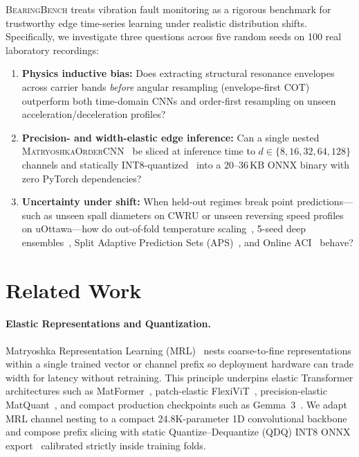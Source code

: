 \documentclass[10pt,twocolumn]{article}
\begin{document}
\textsc{BearingBench} treats vibration fault monitoring as a rigorous benchmark for trustworthy edge time-series learning under realistic distribution shifts. Specifically, we investigate three questions across five random seeds on 100 real laboratory recordings:
\begin{enumerate}
  \item \textbf{Physics inductive bias:} Does extracting structural resonance envelopes across carrier bands \emph{before} angular resampling (envelope-first COT) outperform both time-domain CNNs and order-first resampling on unseen acceleration/deceleration profiles?
  \item \textbf{Precision- and width-elastic edge inference:} Can a single nested \textsc{MatryoshkaOrderCNN}~\cite{kusupati2022matryoshka,nair2025matquant} be sliced at inference time to $d \in \{8, 16, 32, 64, 128\}$ channels and statically INT8-quantized~\cite{jacob2018quantization} into a $20$--$36\,\text{KB}$ ONNX binary with zero PyTorch dependencies?
  \item \textbf{Uncertainty under shift:} When held-out regimes break point predictions---such as unseen spall diameters on CWRU or unseen reversing speed profiles on uOttawa---how do out-of-fold temperature scaling~\cite{guo2017calibration}, 5-seed deep ensembles~\cite{lakshminarayanan2017ensembles}, Split Adaptive Prediction Sets (APS)~\cite{romano2020aps}, and Online ACI~\cite{gibbs2021aci} behave?
\end{enumerate}

\section{Related Work}
\paragraph{Elastic Representations and Quantization.}
Matryoshka Representation Learning (MRL)~\cite{kusupati2022matryoshka} nests coarse-to-fine representations within a single trained vector or channel prefix so deployment hardware can trade width for latency without retraining. This principle underpins elastic Transformer architectures such as MatFormer~\cite{devvrit2024matformer}, patch-elastic FlexiViT~\cite{beyer2023flexivit}, precision-elastic MatQuant~\cite{nair2025matquant}, and compact production checkpoints such as Gemma~3~\cite{gemma2025gemma3}. We adapt MRL channel nesting to a compact 24.8K-parameter 1D convolutional backbone and compose prefix slicing with static Quantize--Dequantize (QDQ) INT8 ONNX export~\cite{jacob2018quantization,nagel2021whitepaper} calibrated strictly inside training folds.
\end{document}
